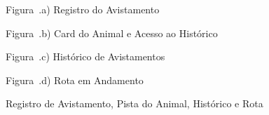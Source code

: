 \begin{figure}[H]
    \centering
    \caption{Registro de Avistamento, Pista do Animal, Histórico e Rota}
    \label{fig:tela_rota_pistas}
    \vspace{0.15cm}
    \begin{minipage}[t]{0.48\textwidth}
        \centering
        \par\vspace{0.12cm}
        {\small Figura~\thefigure.a) Registro do Avistamento}
    \end{minipage}
    \hfill
    \begin{minipage}[t]{0.48\textwidth}
        \centering
        \par\vspace{0.12cm}
        {\small Figura~\thefigure.b) Card do Animal e Acesso ao Histórico}
    \end{minipage}
    \par\vspace{0.3cm}
    \begin{minipage}[t]{0.48\textwidth}
        \centering
        \par\vspace{0.12cm}
        {\small Figura~\thefigure.c) Histórico de Avistamentos}
    \end{minipage}
    \hfill
    \begin{minipage}[t]{0.48\textwidth}
        \centering
        \par\vspace{0.12cm}
        {\small Figura~\thefigure.d) Rota em Andamento}
    \end{minipage}
    \par\vspace{0.12cm}
\end{figure}

